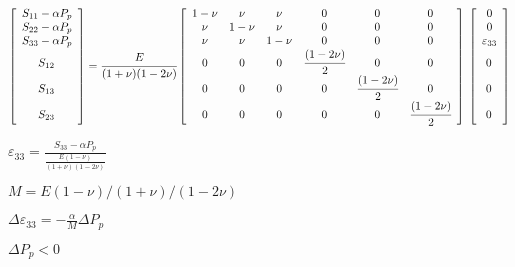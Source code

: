 \documentclass[onecolumn,11pt]{report}
\def\lthtmlcheckvsize{\ifdim\ht\sizebox<\vsize 
  \ifdim\wd\sizebox<\hsize\expandafter\hfill\fi \expandafter\vfill
  \else\expandafter\vss\fi}%
\begin{document}
{\newpage\clearpage
{}%
\begin{displaymath}%
	\left[
\begin{array} {c}
S_{11} - \alpha P_p\\
S_{22} - \alpha P_p\\
S_{33} - \alpha P_p\\
S_{12} \cfrac{}{} \\
S_{13} \cfrac{}{} \\
S_{23} \cfrac{}{}
\end{array}
\right]
= \cfrac{E}{(1+\nu)(1-2\nu)}
\left[
\begin{array}{cccccc}
1-\nu & \nu & \nu & 0 & 0 & 0\\
\nu & 1-\nu & \nu & 0 & 0 & 0\\
\nu & \nu & 1-\nu & 0 & 0 & 0\\
0 & 0 & 0 & \cfrac{(1-2\nu)}{2} & 0 & 0 \\
0 & 0 & 0 & 0 & \cfrac{(1-2\nu)}{2} & 0 \\
0 & 0 & 0 & 0 & 0 & \cfrac{(1-2\nu)}{2}
\end{array}
\right]
\:
\left[
\begin{array} {c}
0 \\
0 \\
\varepsilon_{33} \\
0 \cfrac{}{} \\
0  \cfrac{}{}\\
0 \cfrac{}{}
\end{array}
\right]\end{displaymath}%
\lthtmldisplayZ
\lthtmlcheckvsize\clearpage}

{\newpage\clearpage
{}%
$\displaystyle \varepsilon_{33} = \frac{S_{33} - \alpha P_p}{ \frac{E(1-\nu)}{(1+\nu)(1-2\nu)} }$%
\lthtmlindisplaymathZ
\lthtmlcheckvsize\clearpage}

{\newpage\clearpage
{}%
$ M = E(1-\nu)/(1+\nu)/(1-2\nu)$%
\lthtmlindisplaymathZ
\lthtmlcheckvsize\clearpage}

{\newpage\clearpage
{}%
$\displaystyle \Delta \varepsilon_{33} = -\frac{\alpha}{M}  \Delta P_p$%
\lthtmlindisplaymathZ
\lthtmlcheckvsize\clearpage}

{\newpage\clearpage
{}%
$ \Delta P_p<0$%
\lthtmlindisplaymathZ
\lthtmlcheckvsize\clearpage}
\end{document}
